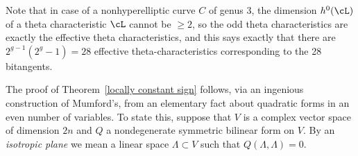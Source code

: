 
Note that in case of a nonhyperelliptic curve $C$ of genus 3, the dimension $h^0(\cL)$ of a theta characteristic $\cL$ cannot be $\geq 2$, so
the odd theta characteristics are exactly the effective theta characteristics, and  this says exactly that there are $2^{g-1}(2^g-1) = 28$ effective theta-characteristics corresponding to the 28 bitangents.

The proof of Theorem~\ref{locally constant sign} follows, via an ingenious construction of Mumford's, from an elementary fact about quadratic forms in an even number of variables.
To state this, suppose that $V$ is a complex vector space of dimension $2n$ and $Q$ a nondegenerate symmetric bilinear form on $V$. By an \emph{isotropic plane} we mean a linear space $\Lambda \subset V$ such that $Q(\Lambda, \Lambda) = 0$. 


